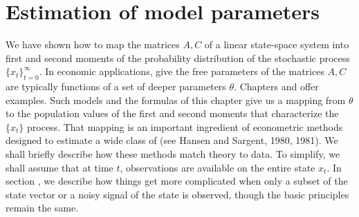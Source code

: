 

\section{Estimation of model parameters}\label{sec:estimation1}%
We have shown  how to map the matrices $A, C$ of a linear state-space system 
into first and second moments of the probability
distribution of the stochastic process $\{x_t\}_{t=0}^\infty$.
In economic applications, give the free parameters of the matrices $A, C$ are typically  functions
of a set of deeper parameters $\theta$. Chapters  and
 offer
examples.
Such  models and the formulas
of this chapter give us a mapping from $\theta$ to the population values of the first and second moments that characterize the $\{x_t\}$ process.  That  mapping
 is an  important ingredient of econometric methods designed to estimate a
wide class of  (see
Hansen and Sargent, 1980, 1981).
%
 We shall briefly describe how these methods  match theory to data.   To simplify, we shall assume that at time $t$,
observations are
available on the entire state $x_t$. In section ,
 we describe how things get  more complicated when
  only a subset of the state vector or a noisy signal of the state is observed,
though the basic principles remain the same.

